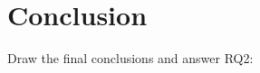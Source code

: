\chapter{Conclusion} \label{Chapter:Conclusion}

Draw the final conclusions and answer RQ2: \researchQuestionTwo